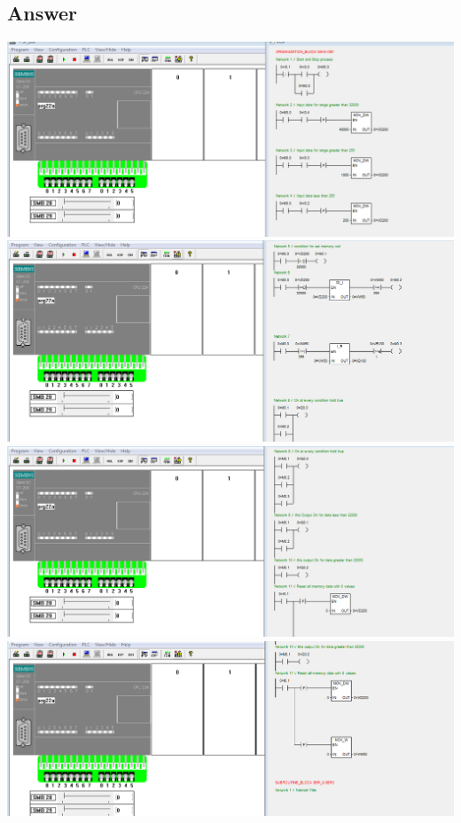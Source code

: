 \documentclass[
	12pt, %
]{fphw}
\begin{document}
\subsection*{Answer}
  \begin{center}
    \includegraphics[width = 165mm, scale =0.9]{p22a1.png}
    \includegraphics[width = 165mm, scale =0.9]{p22a2.png}
    \includegraphics[width = 165mm, scale =0.9]{p22a3.png}
     \includegraphics[width = 165mm, scale =0.9]{p22a4.png}
  \end{center}
\end{document}
